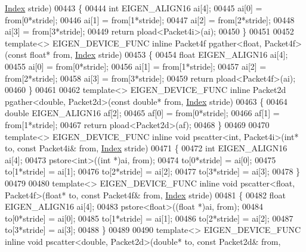 \begin{DoxyCode}
{      \hyperlink{namespace_eigen_a62e77e0933482dafde8fe197d9a2cfde}{Index} stride)
00443 \{
00444   \textcolor{keywordtype}{int} EIGEN\_ALIGN16 ai[4];
00445   ai[0] = from[0*stride];
00446   ai[1] = from[1*stride];
00447   ai[2] = from[2*stride];
00448   ai[3] = from[3*stride];
00449  \textcolor{keywordflow}{return} pload<Packet4i>(ai);
00450 \}
00451 
00452 \textcolor{keyword}{template}<> EIGEN\_DEVICE\_FUNC \textcolor{keyword}{inline} Packet4f pgather<float, Packet4f>(\textcolor{keyword}{const} \textcolor{keywordtype}{float}* from, 
      \hyperlink{namespace_eigen_a62e77e0933482dafde8fe197d9a2cfde}{Index} stride)
00453 \{
00454   \textcolor{keywordtype}{float} EIGEN\_ALIGN16 ai[4];
00455   ai[0] = from[0*stride];
00456   ai[1] = from[1*stride];
00457   ai[2] = from[2*stride];
00458   ai[3] = from[3*stride];
00459  \textcolor{keywordflow}{return} pload<Packet4f>(ai);
00460 \}
00461 
00462 \textcolor{keyword}{template}<> EIGEN\_DEVICE\_FUNC \textcolor{keyword}{inline} Packet2d pgather<double, Packet2d>(\textcolor{keyword}{const} \textcolor{keywordtype}{double}* from, 
      \hyperlink{namespace_eigen_a62e77e0933482dafde8fe197d9a2cfde}{Index} stride)
00463 \{
00464   \textcolor{keywordtype}{double} EIGEN\_ALIGN16 af[2];
00465   af[0] = from[0*stride];
00466   af[1] = from[1*stride];
00467  \textcolor{keywordflow}{return} pload<Packet2d>(af);
00468 \}
00469 
00470 \textcolor{keyword}{template}<> EIGEN\_DEVICE\_FUNC \textcolor{keyword}{inline} \textcolor{keywordtype}{void} pscatter<int, Packet4i>(\textcolor{keywordtype}{int}* to, \textcolor{keyword}{const} Packet4i& from, 
      \hyperlink{namespace_eigen_a62e77e0933482dafde8fe197d9a2cfde}{Index} stride)
00471 \{
00472   \textcolor{keywordtype}{int} EIGEN\_ALIGN16 ai[4];
00473   pstore<int>((\textcolor{keywordtype}{int} *)ai, from);
00474   to[0*stride] = ai[0];
00475   to[1*stride] = ai[1];
00476   to[2*stride] = ai[2];
00477   to[3*stride] = ai[3];
00478 \}
00479 
00480 \textcolor{keyword}{template}<> EIGEN\_DEVICE\_FUNC \textcolor{keyword}{inline} \textcolor{keywordtype}{void} pscatter<float, Packet4f>(\textcolor{keywordtype}{float}* to, \textcolor{keyword}{const} Packet4f& from, 
      \hyperlink{namespace_eigen_a62e77e0933482dafde8fe197d9a2cfde}{Index} stride)
00481 \{
00482   \textcolor{keywordtype}{float} EIGEN\_ALIGN16 ai[4];
00483   pstore<float>((\textcolor{keywordtype}{float} *)ai, from);
00484   to[0*stride] = ai[0];
00485   to[1*stride] = ai[1];
00486   to[2*stride] = ai[2];
00487   to[3*stride] = ai[3];
00488 \}
00489 
00490 \textcolor{keyword}{template}<> EIGEN\_DEVICE\_FUNC \textcolor{keyword}{inline} \textcolor{keywordtype}{void} pscatter<double, Packet2d>(\textcolor{keywordtype}{double}* to, \textcolor{keyword}{const} Packet2d& from, 
}
\end{DoxyCode}
